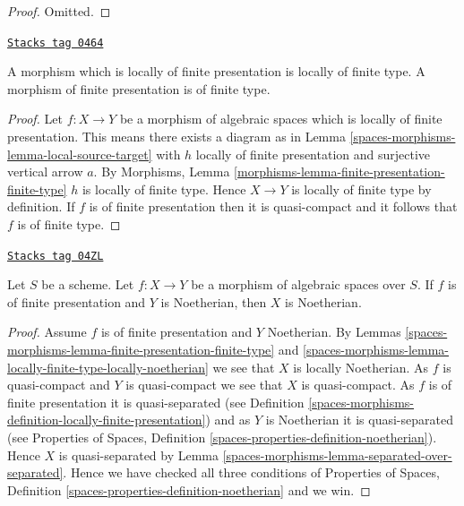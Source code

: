 \begin{proof}
Omitted.
\end{proof}

\begin{lemma}
\label{spaces-morphisms-lemma-finite-presentation-finite-type}
\href{https://stacks.math.columbia.edu/tag/0464}{\texttt{Stacks tag 0464}}

A morphism which is locally of finite presentation is locally of finite type.
A morphism of finite presentation is of finite type.
\end{lemma}

\begin{proof}
Let $f : X \to Y$ be a morphism of algebraic spaces which is locally of
finite presentation. This means there exists a diagram as in
Lemma \ref{spaces-morphisms-lemma-local-source-target}
with $h$ locally of finite presentation and surjective vertical arrow $a$. By
Morphisms, Lemma \ref{morphisms-lemma-finite-presentation-finite-type}
$h$ is locally of finite type.
Hence $X \to Y$ is locally of finite type by definition.
If $f$ is of finite presentation then it is quasi-compact and
it follows that $f$ is of finite type.
\end{proof}

\begin{lemma}
\label{spaces-morphisms-lemma-finite-presentation-noetherian}
\href{https://stacks.math.columbia.edu/tag/04ZL}{\texttt{Stacks tag 04ZL}}

Let $S$ be a scheme.
Let $f : X \to Y$ be a morphism of algebraic spaces over $S$.
If $f$ is of finite presentation and $Y$ is Noetherian,
then $X$ is Noetherian.
\end{lemma}

\begin{proof}
Assume $f$ is of finite presentation and $Y$ Noetherian. By
Lemmas \ref{spaces-morphisms-lemma-finite-presentation-finite-type} and
\ref{spaces-morphisms-lemma-locally-finite-type-locally-noetherian}
we see that $X$ is locally Noetherian. As $f$ is quasi-compact
and $Y$ is quasi-compact we see that $X$ is quasi-compact.
As $f$ is of finite presentation it is quasi-separated (see
Definition \ref{spaces-morphisms-definition-locally-finite-presentation})
and as $Y$ is Noetherian it is quasi-separated (see
Properties of Spaces,
Definition \ref{spaces-properties-definition-noetherian}).
Hence $X$ is quasi-separated by
Lemma \ref{spaces-morphisms-lemma-separated-over-separated}.
Hence we have checked all three conditions of
Properties of Spaces,
Definition \ref{spaces-properties-definition-noetherian}
and we win.
\end{proof}

